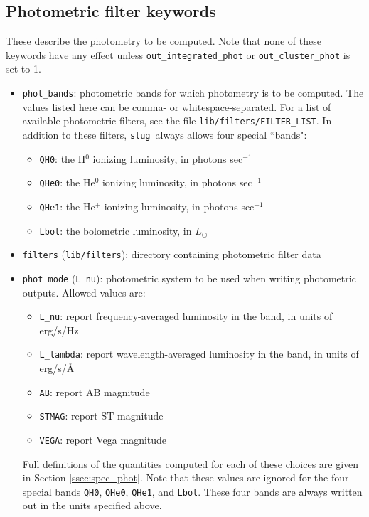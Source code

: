 \documentclass[12pt]{article}
\newcommand{\slug}{\texttt{slug}}
\begin{document}
\subsection{Photometric filter keywords}
\label{ssec:phot_keywords}

These describe the photometry to be computed. Note that none of these keywords have any effect unless \verb=out_integrated_phot= or \verb=out_cluster_phot= is set to 1.
\begin{itemize}
\item \verb=phot_bands=: photometric bands for which photometry is to be computed. The values listed here can be comma- or whitespace-separated. For a list of available photometric filters, see the file \verb=lib/filters/FILTER_LIST=. In addition to these filters, \slug\ always allows four special ``bands":
\begin{itemize}
\item \verb=QH0=: the H$^0$ ionizing luminosity, in photons sec$^{-1}$
\item \verb=QHe0=: the He$^0$ ionizing luminosity, in photons sec$^{-1}$
\item \verb=QHe1=: the He$^+$ ionizing luminosity, in photons sec$^{-1}$
\item \verb=Lbol=: the bolometric luminosity, in $L_\odot$
\end{itemize}
\item \verb=filters= (\verb=lib/filters=): directory containing photometric filter data
\item \verb=phot_mode= (\verb=L_nu=): photometric system to be used when writing photometric outputs. Allowed values are:
\begin{itemize}
\item \verb=L_nu=: report frequency-averaged luminosity in the band, in units of erg/s/Hz
\item \verb=L_lambda=: report wavelength-averaged luminosity in the band, in units of erg/s/\AA
\item \verb=AB=: report AB magnitude
\item \verb=STMAG=: report ST magnitude
\item \verb=VEGA=: report Vega magnitude
\end{itemize}
Full definitions of the quantities computed for each of these choices are given in Section \ref{ssec:spec_phot}. Note that these values are ignored for the four special bands \verb=QH0=, \verb=QHe0=, \verb=QHe1=, and \verb=Lbol=. These four bands are always written out in the units specified above.
\end{itemize}
\end{document}
